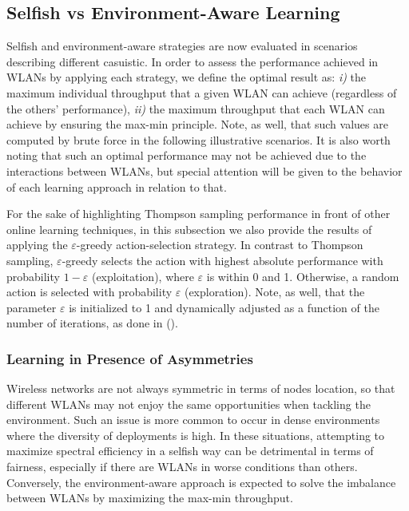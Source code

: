 \documentclass{article}
\begin{document}
\subsection{Selfish vs Environment-Aware Learning}
\label{subsection:selfish_vs_informed}  
Selfish and environment-aware strategies are now evaluated in scenarios describing different casuistic. In order to assess the performance achieved in WLANs by applying each strategy, we define the optimal result as: \emph{i)} the maximum individual throughput that a given WLAN can achieve (regardless of the others' performance), \emph{ii)} the maximum throughput that each WLAN can achieve by ensuring the max-min principle. Note, as well, that such values are computed by brute force in the following illustrative scenarios. It is also worth noting that such an optimal performance may not be achieved due to the interactions between WLANs, but special attention will be given to the behavior of each learning approach in relation to that.

For the sake of highlighting Thompson sampling performance in front of other online learning techniques, in this subsection we also provide the results of applying the $\varepsilon$-greedy action-selection strategy. In contrast to Thompson sampling, $\varepsilon$-greedy selects the action with highest absolute performance with probability $1-\varepsilon$ (exploitation), where $\varepsilon$ is within 0 and 1. Otherwise, a random action is selected with probability $\varepsilon$ (exploration). Note, as well, that the parameter $\varepsilon$ is initialized to 1 and dynamically adjusted as a function of the number of iterations, as done in (\citealp{auer2002finite}).

\subsubsection{Learning in Presence of Asymmetries}
\label{subsubsection:fairness}  	
Wireless networks are not always symmetric in terms of nodes location, so that different WLANs may not enjoy the same opportunities when tackling the environment. Such an issue is more common to occur in dense environments where the diversity of deployments is high. In these situations, attempting to maximize spectral efficiency in a selfish way can be detrimental in terms of fairness, especially if there are WLANs in worse conditions than others. Conversely, the environment-aware approach is expected to solve the imbalance between WLANs by maximizing the max-min throughput.
\end{document}
